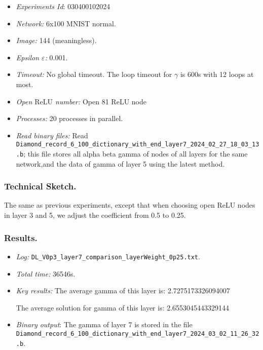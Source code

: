 \documentclass{llncs}
\newcommand{\ReLU}{\mathrm{ReLU}}
\begin{document}
\begin{itemize}
	\item\emph{Experiments Id}: 030400102024
	
	\item\emph{Network:} 6x100 MNIST normal. 
	
	\item\emph{Image:} 144 (meaningless).
	
	\item\emph{Epsilon $\varepsilon$:} 0.001.
	
	\item\emph{Timeout:} No global timeout. The loop timeout for $\gamma$ is 600s with 12 loops at most.
	
	\item\emph{Open $\ReLU$ number:} Open 81 ReLU node
	
	\item\emph{Processes:} 20 processes in parallel. 
	
	\item\emph{Read binary files:} Read \verb*|Diamond_record_6_100_dictionary_with_end_layer7_2024_02_27_18_03_13.b|; this file stores all alpha beta gamma of nodes of all layers for the same network,and the data of gamma of layer 5 using the latest method. 
\end{itemize}


\subsubsection*{Technical Sketch.}

The same as previous experiments, except that when choosing open ReLU nodes in layer 3 and 5, we adjust the coefficient from 0.5 to 0.25.



\subsubsection*{Results.}


\begin{itemize}
	\item \emph{Log:} \verb*|DL_V0p3_layer7_comparison_layerWeight_0p25.txt|.
	
	\item \emph{Total time:} 36546s.
	
	\item \emph{Key results:}  The average gamma of this layer is:  2.7275173326094007
	
	The average solution for gamma of this layer is:  2.6553045443329144
	
	\item  \emph{Binary output}: The gamma of layer 7 is stored in the file \verb*|Diamond_record_6_100_dictionary_with_end_layer7_2024_03_02_11_26_32.b|.
	
\end{itemize}
\end{document}
